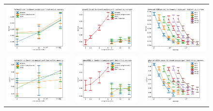 \begin{figure}
\begin{tabular} {c c c}
	\includegraphics[width=0.28\linewidth]{figures/fasttext1m_sst_test-err_vs_compression.pdf} &
	\includegraphics[width=0.28\linewidth]{figures/glove400k_sst_test-err_vs_compression.pdf} &
	\includegraphics[width=0.28\linewidth]{figures/glove-wiki400k-am_sst_test-err_vs_compression.pdf} \\[-0.5em]
	\includegraphics[width=0.28\linewidth]{figures/fasttext1m_cr_test-err_vs_compression.pdf} &
	\includegraphics[width=0.28\linewidth]{figures/glove400k_cr_test-err_vs_compression.pdf} &
	\includegraphics[width=0.28\linewidth]{figures/glove-wiki400k-am_cr_test-err_vs_compression.pdf} \\[-0.5em]

\end{tabular}
\end{figure}
